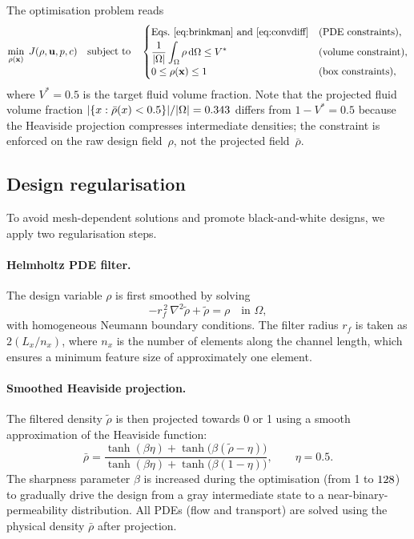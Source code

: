 The optimisation problem reads
\begin{equation}
    \min_{\rho(\mathbf{x})}\; J(\rho,\mathbf{u},p,c)
    \quad\text{subject to}\quad
    \begin{cases}
        \text{Eqs.~\eqref{eq:brinkman} and \eqref{eq:convdiff}} & \text{(PDE constraints)},\\[2pt]
        \displaystyle \frac{1}{|\Omega|}\int_\Omega \rho\,\mathrm{d}\Omega \le V^* & \text{(volume constraint)},\\[2pt]
        0 \le \rho(\mathbf{x}) \le 1 & \text{(box constraints)},
    \end{cases}
    \label{eq:opt}
\end{equation}
where \(V^* = 0.5\) is the target fluid volume fraction.
Note that the projected fluid volume fraction
$|\{x : \bar{\rho}(x) < 0.5\}|/|\Omega| = 0.343$
differs from $1 - V^* = 0.5$ because the Heaviside projection
compresses intermediate densities; the constraint is enforced
on the raw design field~$\rho$, not the projected field~$\bar\rho$.

\subsection{Design regularisation}
To avoid mesh-dependent solutions and promote black-and-white designs, we apply two regularisation steps.

\paragraph{Helmholtz PDE filter.}
The design variable \(\rho\) is first smoothed by solving
\begin{equation}
    -r_f^{\,2}\,\nabla^2 \tilde{\rho} + \tilde{\rho} = \rho \quad\text{in } \Omega,
    \label{eq:helmholtz}
\end{equation}
with homogeneous Neumann boundary conditions.
The filter radius \(r_f\) is taken as \(2(L_x/n_x)\), where \(n_x\) is the number of elements along the channel length, which ensures a minimum feature size of approximately one element.

\paragraph{Smoothed Heaviside projection.}
The filtered density \(\tilde{\rho}\) is then projected towards 0 or 1 using a smooth approximation of the Heaviside function:
\begin{equation}
    \bar{\rho} = \frac{\tanh(\beta\eta) + \tanh\!\bigl(\beta(\tilde{\rho} - \eta)\bigr)}
                    {\tanh(\beta\eta) + \tanh\!\bigl(\beta(1 - \eta)\bigr)},
    \qquad \eta = 0.5.
    \label{eq:heaviside}
\end{equation}
The sharpness parameter \(\beta\) is increased during the optimisation (from 1 to $128$) to gradually drive the design from a gray intermediate state to a near-binary-permeability distribution.
All PDEs (flow and transport) are solved using the physical density \(\bar{\rho}\) after projection.

